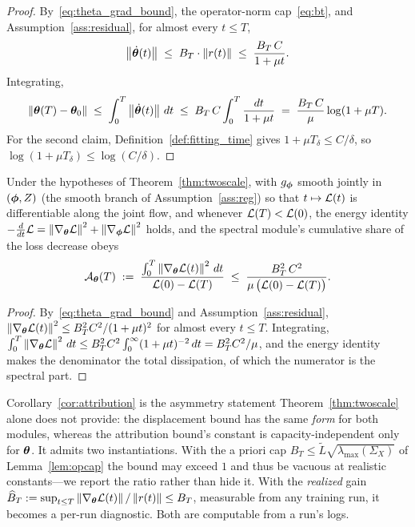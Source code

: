 \begin{proof}
By~\eqref{eq:theta_grad_bound}, the operator-norm cap~\eqref{eq:bt},
and Assumption~\ref{ass:residual}, for almost every $t \leq T$,
\[
    \left\lVert\dot{{\boldsymbol{\theta}}}(t)\right\rVert
    \;\leq\; B_T \cdot \left\lVert r(t)\right\rVert
    \;\leq\; \frac{B_T\,C}{1 + \mu t}.
\]
Integrating,
\[
    \left\lVert{\boldsymbol{\theta}}(T) - {\boldsymbol{\theta}}_0\right\rVert
    \;\leq\; \int_0^T \left\lVert\dot{{\boldsymbol{\theta}}}(t)\right\rVert\, dt
    \;\leq\; B_T\,C \int_0^T \frac{dt}{1 + \mu t}
    \;=\; \frac{B_T\,C}{\mu} \log(1 + \mu T).
\]
For the second claim, Definition~\ref{def:fitting_time} gives
$1 + \mu T_\delta \leq C / \delta$, so $\log(1 + \mu T_\delta) \leq
\log(C/\delta)$.
\end{proof}

\begin{corollary}
\label{cor:attribution}
Under the hypotheses of Theorem~\ref{thm:twoscale}, with $g_{\boldsymbol{\phi}}$
smooth jointly in $({\boldsymbol{\phi}}, Z)$ (the smooth branch of
Assumption~\ref{ass:reg}) so that $t \mapsto \mathcal{L}(t)$ is
differentiable along the joint flow, and whenever
$\mathcal{L}(T) < \mathcal{L}(0)$, the energy identity
$-\frac{d}{dt}\mathcal{L} = \left\lVert\nabla_{\boldsymbol{\theta}} \mathcal{L}\right\rVert^2 +
\left\lVert\nabla_{\boldsymbol{\phi}} \mathcal{L}\right\rVert^2$ holds, and the spectral module's
cumulative share of the loss decrease obeys
\[
    \mathcal{A}_{\boldsymbol{\theta}}(T)
    \;:=\; \frac{\int_0^T \left\lVert\nabla_{\boldsymbol{\theta}} \mathcal{L}(t)\right\rVert^2\,dt}
                {\mathcal{L}(0) - \mathcal{L}(T)}
    \;\leq\; \frac{B_T^2\,C^2}
                  {\mu\,\bigl(\mathcal{L}(0) - \mathcal{L}(T)\bigr)}.
\]
\end{corollary}

\begin{proof}
By~\eqref{eq:theta_grad_bound} and Assumption~\ref{ass:residual},
$\left\lVert\nabla_{\boldsymbol{\theta}} \mathcal{L}(t)\right\rVert^2 \leq B_T^2 C^2/(1 + \mu t)^2$ for
almost every $t \leq T$. Integrating,
$\int_0^T \left\lVert\nabla_{\boldsymbol{\theta}} \mathcal{L}\right\rVert^2\,dt
\leq B_T^2 C^2 \int_0^\infty (1 + \mu t)^{-2}\,dt
= B_T^2 C^2/\mu$, and the energy identity makes the denominator the
total dissipation, of which the numerator is the spectral part.
\end{proof}

\begin{remark}
\label{rem:attribution_use}
Corollary~\ref{cor:attribution} is the asymmetry statement
Theorem~\ref{thm:twoscale} alone does not provide: the displacement
bound has the same \emph{form} for both modules, whereas the
attribution bound's constant is capacity-independent only for
${\boldsymbol{\theta}}$. It admits two instantiations. With the a priori cap
$B_T \leq \widetilde{L}\sqrt{\lambda_{\max}(\Sigma_X)}$ of
Lemma~\ref{lem:opcap} the bound may exceed $1$ and thus be vacuous
at realistic constants---we report the ratio rather than hide it.
With the \emph{realized} gain
$\widehat{B}_T := \sup_{t \leq T}
\left\lVert\nabla_{\boldsymbol{\theta}} \mathcal{L}(t)\right\rVert/\left\lVert r(t)\right\rVert \leq B_T$, measurable
from any training run, it becomes a per-run diagnostic. Both are
computable from a run's logs.
\end{remark}

